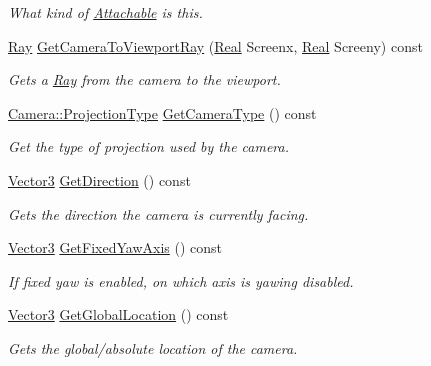 \begin{DoxyCompactItemize}
\begin{DoxyCompactList}\small\item\em What kind of \hyperlink{classphys_1_1Attachable}{Attachable} is this. \item\end{DoxyCompactList}\item 
\hyperlink{classphys_1_1Ray}{Ray} \hyperlink{classphys_1_1Camera_a01d119eb8bd10a8654493b043110ca0f}{GetCameraToViewportRay} (\hyperlink{namespacephys_af7eb897198d265b8e868f45240230d5f}{Real} Screenx, \hyperlink{namespacephys_af7eb897198d265b8e868f45240230d5f}{Real} Screeny) const 
\begin{DoxyCompactList}\small\item\em Gets a \hyperlink{classphys_1_1Ray}{Ray} from the camera to the viewport. \item\end{DoxyCompactList}\item 
\hyperlink{classphys_1_1Camera_a87d8d46e9eb2080b10712079be69d86a}{Camera::ProjectionType} \hyperlink{classphys_1_1Camera_aa79582e78a3eff11a8c4fe9c058566b0}{GetCameraType} () const 
\begin{DoxyCompactList}\small\item\em Get the type of projection used by the camera. \item\end{DoxyCompactList}\item 
\hyperlink{classphys_1_1Vector3}{Vector3} \hyperlink{classphys_1_1Camera_a6f0294569edb3e65de4139da361f83a9}{GetDirection} () const 
\begin{DoxyCompactList}\small\item\em Gets the direction the camera is currently facing. \item\end{DoxyCompactList}\item 
\hyperlink{classphys_1_1Vector3}{Vector3} \hyperlink{classphys_1_1Camera_a1f4126761e14d9b960395c79b6c4f13f}{GetFixedYawAxis} () const 
\begin{DoxyCompactList}\small\item\em If fixed yaw is enabled, on which axis is yawing disabled. \item\end{DoxyCompactList}\item 
\hyperlink{classphys_1_1Vector3}{Vector3} \hyperlink{classphys_1_1Camera_a7f71146cd533f6a1fc8426a9ed40b763}{GetGlobalLocation} () const 
\begin{DoxyCompactList}\small\item\em Gets the global/absolute location of the camera. \item\end{DoxyCompactList}\item 

\end{DoxyCompactItemize}
